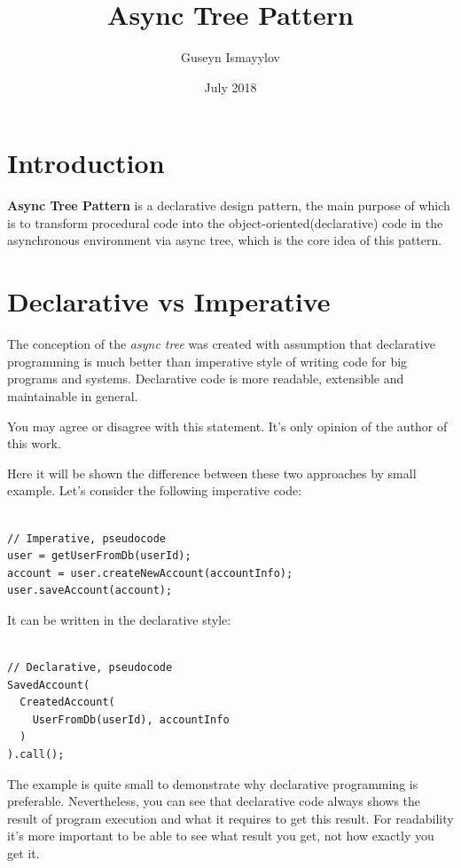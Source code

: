 \documentclass{article}
\title{Async Tree Pattern}
\author{Guseyn Ismayylov}
\date{July 2018}
\begin{document}
\maketitle

\section{Introduction}

\textbf{Async Tree Pattern} is a declarative design pattern, the main purpose of which is to transform procedural code into the object-oriented(declarative) code in the asynchronous environment via async tree, which is the core idea of this pattern.

\section{Declarative vs Imperative}

The conception of the \textit{async tree} was created with assumption that declarative programming is much better than imperative style of writing code for big programs and systems. Declarative code is more readable, extensible and maintainable in general.

You may agree or disagree with this statement. It's only opinion of the author of this work.

Here it will be shown the difference between these two approaches by small example. Let's consider the following imperative code:  

\begin{lstlisting}

// Imperative, pseudocode
user = getUserFromDb(userId);
account = user.createNewAccount(accountInfo);
user.saveAccount(account);

\end{lstlisting}

It can be written in the declarative style:

\begin{lstlisting}

// Declarative, pseudocode
SavedAccount(
  CreatedAccount(
    UserFromDb(userId), accountInfo
  )
).call();

\end{lstlisting}

The example is quite small to demonstrate why declarative programming is preferable. Nevertheless, you can see that declarative code always shows the result of program execution and what it requires to get this result. For readability it's more important to be able to see what result you get, not how exactly you get it.
\end{document}
